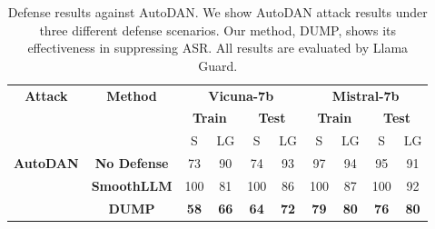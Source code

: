 \renewcommand{\arraystretch}{1.5}
\setlength{\tabcolsep}{2pt} %
\captionsetup[table]{justification=raggedright, singlelinecheck=false}
\begin{table}[!t]
    \centering
    \small
    \begin{tabular}{cccccccccc}  %
        \hline
         \multirow{3}{*}{\textbf{Attack}} & \multirow{3}{*}{\textbf{Method}} & \multicolumn{4}{c}{\textbf{Vicuna-7b}} & \multicolumn{4}{c}{\textbf{Mistral-7b}} \\
        \cline{3-6} \cline{7-10} 
        & & \multicolumn{2}{c}{\textbf{Train}} & \multicolumn{2}{c}{\textbf{Test}} & \multicolumn{2}{c}{\textbf{Train}} & \multicolumn{2}{c}{\textbf{Test}} \\
        \cline{3-10}
            & & S & LG & S & LG & S & LG & S & LG \\ 
            \hline
            \multirow{3}{*}{\textbf{AutoDAN}} & \textbf{No Defense} & 73 & 90 & 74 & 93 & 97 & 94 & 95 & 91 \\
            & \textbf{SmoothLLM} & 100 & 81 & 100 & 86 & 100 & 87 & 100 & 92 \\
            & \textbf{DUMP} & \textbf{58} & \textbf{66} & \textbf{64} & \textbf{72} & \textbf{79} & \textbf{80} & \textbf{76} & \textbf{80} \\
        \hline
    \end{tabular}
        \caption{Defense results against AutoDAN. We show AutoDAN attack results under three different defense scenarios. Our method, DUMP, shows its effectiveness in suppressing ASR. All results are evaluated by Llama Guard.}
        \label{tab:dump}
\end{table}
